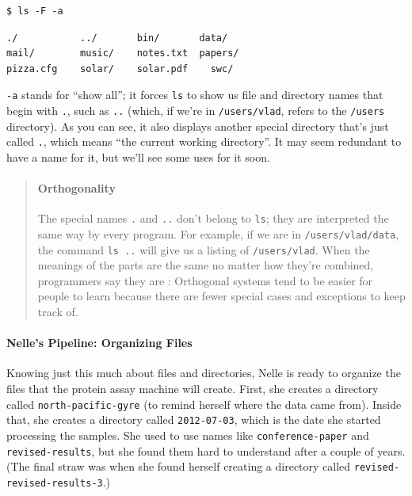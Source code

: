 \documentclass{book}
\begin{document}
\begin{verbatim}
$ ls -F -a
\end{verbatim}

\begin{verbatim}
./           ../       bin/       data/
mail/        music/    notes.txt  papers/
pizza.cfg    solar/    solar.pdf    swc/
\end{verbatim}

\texttt{-a} stands for ``show all''; it forces \texttt{ls} to show us
file and directory names that begin with \texttt{.}, such as \texttt{..}
(which, if we're in \texttt{/users/vlad}, refers to the \texttt{/users}
directory). As you can see, it also displays another special directory
that's just called \texttt{.}, which means ``the current working
directory''. It may seem redundant to have a name for it, but we'll see
some uses for it soon.

\begin{quote}
\mbox{}\paragraph{Orthogonality}

The special names \texttt{.} and \texttt{..} don't belong to
\texttt{ls}; they are interpreted the same way by every program. For
example, if we are in \texttt{/users/vlad/data}, the command
\texttt{ls ..} will give us a listing of \texttt{/users/vlad}. When the
meanings of the parts are the same no matter how they're combined,
programmers say they are : Orthogonal
systems tend to be easier for people to learn because there are fewer
special cases and exceptions to keep track of.
\end{quote}

\mbox{}\paragraph{Nelle's Pipeline: Organizing Files}

Knowing just this much about files and directories, Nelle is ready to
organize the files that the protein assay machine will create. First,
she creates a directory called \texttt{north-pacific-gyre} (to remind
herself where the data came from). Inside that, she creates a directory
called \texttt{2012-07-03}, which is the date she started processing the
samples. She used to use names like \texttt{conference-paper} and
\texttt{revised-results}, but she found them hard to understand after a
couple of years. (The final straw was when she found herself creating a
directory called \texttt{revised-revised-results-3}.)
\end{document}
